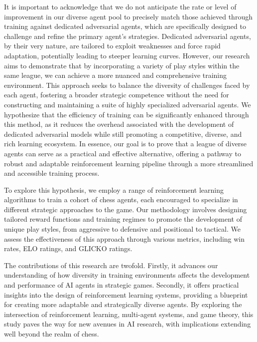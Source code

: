 \documentclass[journal]{IEEEtran}
\begin{document}
	It is important to acknowledge that we do not anticipate the rate or level of improvement 
	in our diverse agent pool to precisely match those achieved through training against dedicated adversarial agents, 
	which are specifically designed to challenge and refine the primary agent's strategies. 
	Dedicated adversarial agents, by their very nature, are tailored to exploit weaknesses and force rapid adaptation, 
	potentially leading to steeper learning curves. However, our research aims to demonstrate that by incorporating a variety 
	of play styles within the same league, we can achieve a more nuanced and comprehensive training environment. 
	This approach seeks to balance the diversity of challenges faced by each agent, fostering a broader strategic competence 
	without the need for constructing and maintaining a suite of highly specialized adversarial agents. 
	We hypothesize that the efficiency of training can be significantly enhanced through this method,
	as it reduces the overhead associated with the development of 
	dedicated adversarial models while still promoting a competitive, diverse, and rich learning ecosystem. 
	In essence, our goal is to prove that a league of diverse agents can serve as a practical and effective alternative, 
	offering a pathway to robust and adaptable reinforcement learning pipeline through a more streamlined and accessible training process.
		
	To explore this hypothesis, we employ a range of reinforcement learning algorithms to train a cohort of chess agents, each encouraged to specialize in different strategic approaches to the game. 
	Our methodology involves designing tailored reward functions and training regimes to promote the development of unique play styles, 
	from aggressive to defensive and positional to tactical. 
	We assess the effectiveness of this approach through various metrics, 
	including win rates, ELO ratings,
	and GLICKO ratings.
		
	The contributions of this research are twofold. 
	Firstly, it advances our understanding of how diversity in training environments affects 
	the development and performance of AI agents in strategic games. 
	Secondly, it offers practical insights into the design of reinforcement learning systems, 
	providing a blueprint for creating more adaptable and strategically diverse agents. 
	By exploring the intersection of reinforcement learning, multi-agent systems, and game theory, 
	this study paves the way for new avenues in AI research, with implications extending well beyond the realm of chess.
\end{document}
